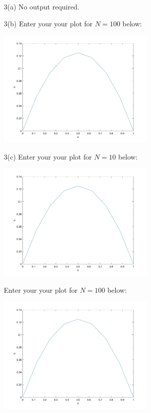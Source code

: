 \documentclass[a4,10pt, fleqn]{article}  %
\begin{document}
\begin{enumerate}
\item[3(a)] No output required.
\item[3(b)] 
Enter your your plot for $N=100$ below:
\begin{center}
\includegraphics[width=0.6\textwidth]{solution.jpg} %
\end{center}
\item[3(c)] 
Enter your your plot for $N=10$ below:
\begin{center}
\includegraphics[width=0.6\textwidth]{solution.jpg} %
\end{center}
Enter your your plot for $N=100$ below:
\begin{center}
\includegraphics[width=0.6\textwidth]{solution.jpg} %
\end{center}
\end{enumerate}
\end{document}
